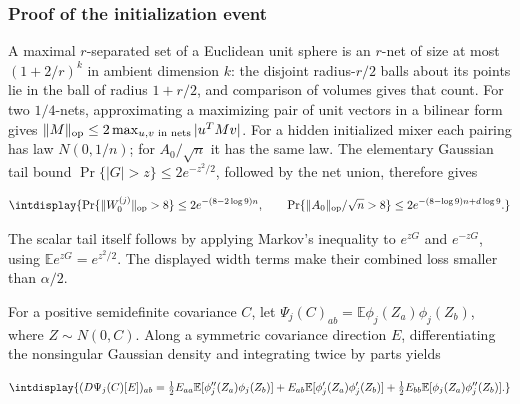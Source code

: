 \subsubsection{Proof of the initialization event}



A maximal \(r\)-separated set of a Euclidean unit sphere is an \(r\)-net of size at most \((1+2/r)^k\) in ambient dimension \(k\): the disjoint radius-\(r/2\) balls about its points lie in the ball of radius \(1+r/2\), and comparison of volumes gives that count. For two \(1/4\)-nets, approximating a maximizing pair of unit vectors in a bilinear form gives \(\|M\|_{\rm op}\le2\max_{u,\allowbreak v\text{ in nets}}|u^TMv|\). For a hidden initialized mixer each pairing has law \(N(0,\allowbreak 1/n)\); for \(A_0/\sqrt n\) it has the same law. The elementary Gaussian tail bound \(\Pr\{|G|>z\}\le2e^{-z^2/2}\), followed by the net union, therefore gives


\begingroup\renewcommand{\theHequation}{intdisplay.439}
\begin{equation*}
\intdisplay{
\Pr\{\|W_0^{(j)}\|_{\rm op}>8\}
\le2e^{-(8-2\log9)n},\qquad
\Pr\{\|A_0\|_{\rm op}/\sqrt n>8\}
\le2e^{-(8-\log9)n+d\log9}.
}
\end{equation*}
\endgroup


The scalar tail itself follows by applying Markov's inequality to \(e^{zG}\) and \(e^{-zG}\), using \(\mathbb Ee^{zG}=e^{z^2/2}\). The displayed width terms make their combined loss smaller than \(\alpha/2\).



For a positive semidefinite covariance \(C\), let \(\Psi_j(C)_{ab}=\mathbb E\phi_j(Z_a)\phi_j(Z_b)\), where \(Z\sim N(0,\allowbreak C)\). Along a symmetric covariance direction \(E\), differentiating the nonsingular Gaussian density and integrating twice by parts yields


\begingroup\renewcommand{\theHequation}{intdisplay.440}
\begin{equation*}
\intdisplay{
(D\Psi_j(C)[E])_{ab}=
\tfrac12E_{aa}\mathbb E[\phi_j''(Z_a)\phi_j(Z_b)]
+E_{ab}\mathbb E[\phi_j'(Z_a)\phi_j'(Z_b)]
+\tfrac12E_{bb}\mathbb E[\phi_j(Z_a)\phi_j''(Z_b)].
}
\end{equation*}
\endgroup



